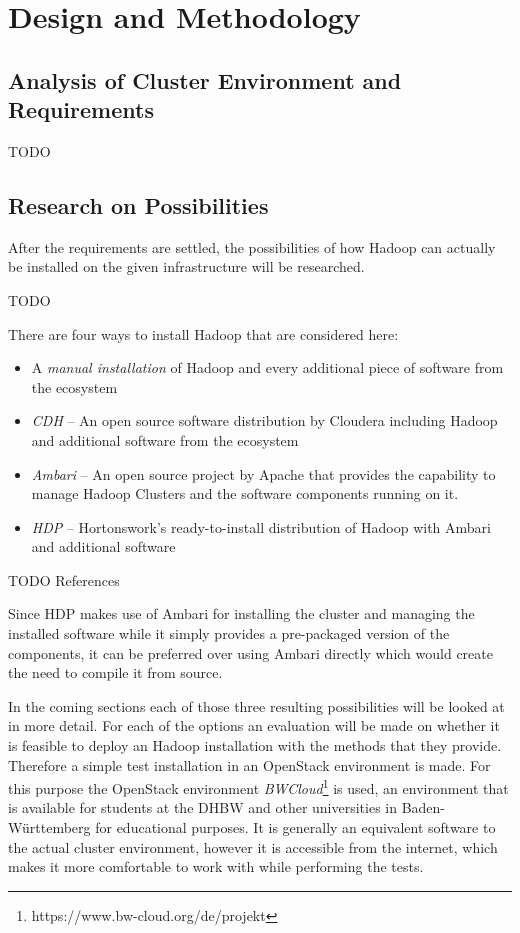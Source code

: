 \chapter{Design and Methodology}
\label{chap:design}

\section{Analysis of Cluster Environment and Requirements}

TODO

\section{Research on Possibilities}

After the requirements are settled,
the possibilities of how Hadoop can actually be installed 
on the given infrastructure will be researched.

TODO

There are four ways to install Hadoop that are considered here:

\begin{itemize}
    \item A \emph{manual installation} of Hadoop 
        and every additional piece of software from the ecosystem
    \item \emph{\ac{CDH}} --  An open source software distribution by Cloudera including Hadoop
        and additional software from the ecosystem
    \item \emph{Ambari} -- An open source project by Apache that provides
        the capability to manage Hadoop Clusters and the software components running on it.
    \item \emph{\ac{HDP}} -- Hortonswork's ready-to-install distribution of Hadoop 
        with Ambari and additional software
\end{itemize}

TODO References

Since \ac{HDP} makes use of Ambari for installing the cluster and managing the installed software while it simply provides a pre-packaged version of the components, 
it can be preferred over using Ambari directly which would create the need to compile it from source.

In the coming sections each of those three resulting possibilities will be looked at in more detail.
For each of the options an evaluation will be made on whether it is 
feasible to deploy an Hadoop installation with the methods that they provide.
Therefore a simple test installation in an OpenStack environment is made.
For this purpose the OpenStack environment \emph{BWCloud}\footnote{https://www.bw-cloud.org/de/projekt} 
is used, an environment that is available for students at the \ac{DHBW} 
and other universities in Baden-Württemberg for educational purposes. 
It is generally an equivalent software to the actual cluster environment, 
however it is accessible from the internet, 
which makes it more comfortable to work with while performing the tests.

